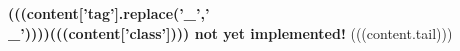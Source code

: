 \textbf{(((content['tag'].replace('_','\\_'))))(((content['class']))) not yet implemented!}
(((content.tail)))
